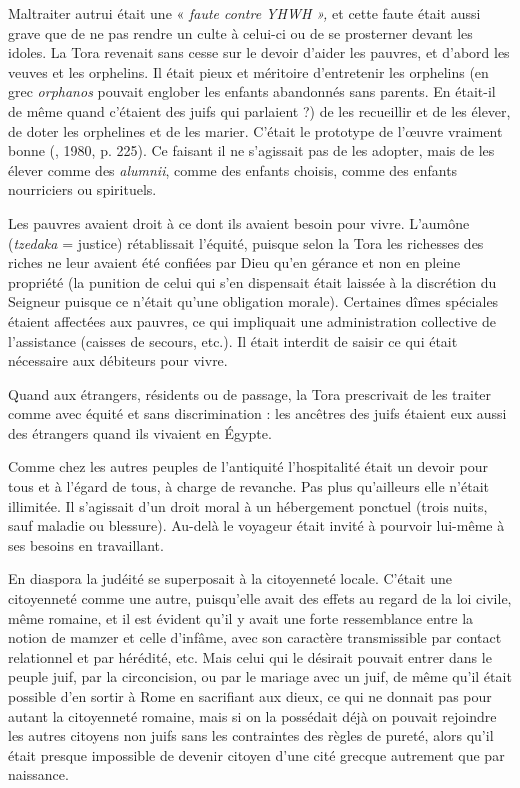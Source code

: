  Maltraiter autrui était une « \emph{faute contre YHWH »,} et cette faute était aussi grave que de ne pas rendre un culte à celui-ci ou de se prosterner devant les idoles. La Tora revenait sans cesse sur le devoir d'aider les pauvres, et d'abord les veuves et les orphelins. Il était pieux et méritoire d'entretenir les orphelins (en grec \emph{orphanos} pouvait englober les enfants abandonnés sans parents. En était-il de même quand c'étaient des juifs qui parlaient ?) de les recueillir et de les élever, de doter les orphelines et de les marier. C'était le prototype de l'œuvre vraiment bonne (, 1980, p. 225). Ce faisant il ne s'agissait pas de les adopter, mais de les élever comme des \emph{alumnii}, comme des enfants choisis, comme des enfants nourriciers ou spirituels. 

 Les pauvres avaient droit à ce dont ils avaient besoin pour vivre. L'aumône (\emph{tzedaka} = justice) rétablissait l'équité, puisque selon la Tora les richesses des riches ne leur avaient été confiées par Dieu qu'en gérance et non en pleine propriété (la punition de celui qui s'en dispensait était laissée à la discrétion du Seigneur puisque ce n'était qu'une obligation morale). Certaines dîmes spéciales étaient affectées aux pauvres, ce qui impliquait une administration collective de l'assistance (caisses de secours, etc.). Il était interdit de saisir ce qui était nécessaire aux débiteurs pour vivre. 

 Quand aux étrangers, résidents ou de passage, la Tora prescrivait de les traiter comme avec équité et sans discrimination : les ancêtres des juifs étaient eux aussi des étrangers quand ils vivaient en Égypte. 

 Comme chez les autres peuples de l'antiquité l'hospitalité était un devoir pour tous et à l'égard de tous, à charge de revanche. Pas plus qu'ailleurs elle n'était illimitée. Il s'agissait d'un droit moral à un hébergement ponctuel (trois nuits, sauf maladie ou blessure). Au-delà le voyageur était invité à pourvoir lui-même à ses besoins en travaillant. 

 En diaspora la judéité se superposait à la citoyenneté locale. C'était une citoyenneté comme une autre, puisqu'elle avait des effets au regard de la loi civile, même romaine, et il est évident qu'il y avait une forte ressemblance entre la notion de mamzer et celle d'infâme, avec son caractère transmissible par contact relationnel et par hérédité, etc. Mais celui qui le désirait pouvait entrer dans le peuple juif, par la circoncision, ou par le mariage avec un juif, de même qu'il était possible d'en sortir à Rome en sacrifiant aux dieux, ce qui ne donnait pas pour autant la citoyenneté romaine, mais si on la possédait déjà on pouvait rejoindre les autres citoyens non juifs sans les contraintes des règles de pureté, alors qu'il était presque impossible de devenir citoyen d'une cité grecque autrement que par naissance.

